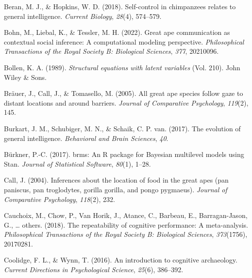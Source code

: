 \documentclass[
  man,floatsintext]{apa6}
\newlength{\cslhangindent}
\newlength{\cslentryspacingunit} %
\newenvironment{CSLReferences}[2] %
 {%
  \setlength{\parindent}{0pt}
  \ifodd #1
  \let\oldpar\par
  \def\par{\hangindent=\cslhangindent\oldpar}
  \fi
  \setlength{\parskip}{#2\cslentryspacingunit}
 }%
 {}
\begin{document}
\hypertarget{refs}{}
\begin{CSLReferences}{1}{0}
\leavevmode{}%
Beran, M. J., \& Hopkins, W. D. (2018). Self-control in chimpanzees relates to general intelligence. \emph{Current Biology}, \emph{28}(4), 574--579.

\leavevmode{}%
Bohn, M., Liebal, K., \& Tessler, M. H. (2022). Great ape communication as contextual social inference: A computational modeling perspective. \emph{Philosophical Transactions of the Royal Society B: Biological Sciences}, \emph{377}, 20210096.

\leavevmode{}%
Bollen, K. A. (1989). \emph{Structural equations with latent variables} (Vol. 210). John Wiley \& Sons.

\leavevmode{}%
Bräuer, J., Call, J., \& Tomasello, M. (2005). All great ape species follow gaze to distant locations and around barriers. \emph{Journal of Comparative Psychology}, \emph{119}(2), 145.

\leavevmode{}%
Burkart, J. M., Schubiger, M. N., \& Schaik, C. P. van. (2017). The evolution of general intelligence. \emph{Behavioral and Brain Sciences}, \emph{40}.

\leavevmode{}%
Bürkner, P.-C. (2017). {brms}: An {R} package for {Bayesian} multilevel models using {Stan}. \emph{Journal of Statistical Software}, \emph{80}(1), 1--28.

\leavevmode{}%
Call, J. (2004). Inferences about the location of food in the great apes (pan paniscus, pan troglodytes, gorilla gorilla, and pongo pygmaeus). \emph{Journal of Comparative Psychology}, \emph{118}(2), 232.

\leavevmode{}%
Cauchoix, M., Chow, P., Van Horik, J., Atance, C., Barbeau, E., Barragan-Jason, G., \ldots{} others. (2018). The repeatability of cognitive performance: A meta-analysis. \emph{Philosophical Transactions of the Royal Society B: Biological Sciences}, \emph{373}(1756), 20170281.

\leavevmode{}%
Coolidge, F. L., \& Wynn, T. (2016). An introduction to cognitive archaeology. \emph{Current Directions in Psychological Science}, \emph{25}(6), 386--392.


\end{CSLReferences}
\end{document}

